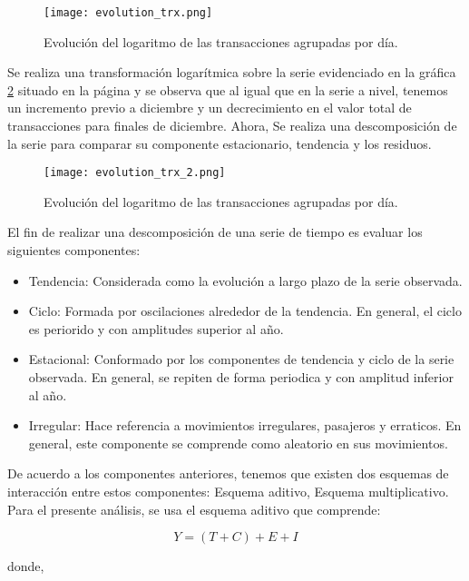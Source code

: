 \documentclass[a4paper]{article}
\begin{document}
\begin{figure}[h]
    \centering
	\texttt{[image: evolution\_trx.png]}
    \caption{Evolución del logaritmo de las transacciones agrupadas por día.}
    \label{fig:evolution_trx}
\end{figure}


Se realiza una transformación logarítmica sobre la serie evidenciado en la gráfica \ref{fig:evolution_trx_2} situado en la página \pageref{fig:evolution_trx} y se observa que al igual que en la serie a nivel, tenemos un incremento previo a diciembre y un decrecimiento en el valor total de transacciones para finales de diciembre. Ahora, Se realiza una descomposición de la serie para comparar su componente estacionario, tendencia y los residuos.

\begin{figure}[h]
    \centering
	\texttt{[image: evolution\_trx\_2.png]}
    \caption{Evolución del logaritmo de las transacciones agrupadas por día.}
    \label{fig:evolution_trx_2}
\end{figure}

El fin de realizar una descomposición de una serie de tiempo es evaluar los siguientes componentes:

\begin{itemize}
	\item Tendencia: Considerada como la evolución a largo plazo de la serie observada.
	\item Ciclo: Formada por oscilaciones alrededor de la tendencia. En general, el ciclo es periorido y con amplitudes superior al año.
	\item Estacional: Conformado por los componentes de tendencia y ciclo de la serie observada. En general, se repiten de forma periodica y con amplitud inferior al año.
	\item Irregular: Hace referencia a movimientos irregulares, pasajeros y erraticos. En general, este componente se comprende como aleatorio en sus movimientos.
\end{itemize}

De acuerdo a los componentes anteriores, tenemos que existen dos esquemas de interacción entre estos componentes: Esquema aditivo, Esquema multiplicativo. Para el presente análisis, se usa el esquema aditivo que comprende:

\begin{equation}
Y = (T + C) + E + I
\end{equation}

donde,
\end{document}
